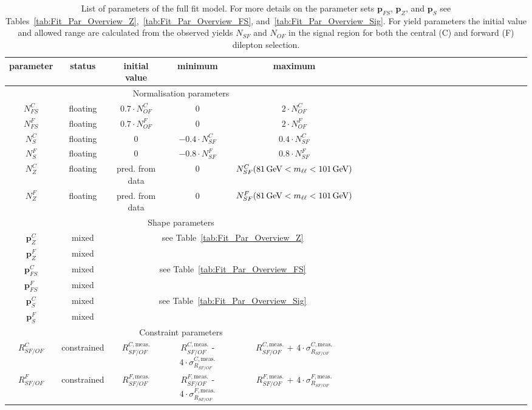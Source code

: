 \begin{table}[htbp]
\begin{center}
 \renewcommand{\arraystretch}{1.3}
 \caption{List of parameters of the full fit model. For more details on the parameter sets $\mathbf{p}_{FS}$, $\mathbf{p}_{Z}$, and $\mathbf{p}_{S}$ see Tables~\ref{tab:Fit_Par_Overview_Z},~\ref{tab:Fit_Par_Overview_FS}, and~\ref{tab:Fit_Par_Overview_Sig}. For yield parameters the initial value and allowed range are calculated from the observed yields $N_{SF}$ and $N_{OF}$ in the signal region for both the central (C) and forward (F) dilepton selection.\label{tab:Fit_Par_Overview_Full}}
\begin{tabular}{c|c|c|c|ccccccccccccccccccccc}
parameter & status & initial value & minimum & maximum \\ \hline
\multicolumn{5}{c}{Normalisation parameters}\\ \hline
$N_{FS}^{C}$ & floating & $0.7\cdot N_{OF}^{C}$ & 0 & $2\cdot N_{OF}^{C}$ \\
$N_{FS}^{F}$ & floating & $0.7\cdot N_{OF}^{F}$ & 0 & $2\cdot N_{OF}^{F}$ \\
$N_{S}^{C}$ & floating & 0 &  $-0.4\cdot N_{SF}^{C}$ &  $0.4\cdot N_{SF}^{C}$ \\
$N_{S}^{F}$ & floating & 0 &  $-0.8\cdot N_{SF}^{F}$ &  $0.8\cdot N_{SF}^{F}$ \\
$N_{Z}^{C}$ & floating & pred. from data & 0 & $N_{SF}^{C}(81\,\mathrm{Ge\hspace{-.08em}V} < m_{\ell\ell} < 101\,\mathrm{Ge\hspace{-.08em}V})$ \\
$N_{Z}^{F}$ & floating & pred. from data & 0 & $N_{SF}^{F}(81\,\mathrm{Ge\hspace{-.08em}V} < m_{\ell\ell} < 101\,\mathrm{Ge\hspace{-.08em}V})$ \\ \hline
\multicolumn{5}{c}{Shape parameters} \\ \hline
$\mathbf{p}_{Z}^{C}$ & mixed & \multicolumn{3}{c}{\multirow{2}{*}{see Table~\ref{tab:Fit_Par_Overview_Z}}}\\
$\mathbf{p}_{Z}^{F}$ & mixed & \multicolumn{3}{c}{}\\
$\mathbf{p}_{FS}^{C}$ & mixed & \multicolumn{3}{c}{\multirow{2}{*}{see Table~\ref{tab:Fit_Par_Overview_FS}}}\\
$\mathbf{p}_{FS}^{F}$ & mixed & \multicolumn{3}{c}{}\\
$\mathbf{p}_{S}^{C}$ & mixed & \multicolumn{3}{c}{\multirow{2}{*}{see Table~\ref{tab:Fit_Par_Overview_Sig}}}\\
$\mathbf{p}_{S}^{F}$ & mixed & \multicolumn{3}{c}{}\\ \hline
\multicolumn{5}{c}{Constraint parameters}\\ \hline
$R_{SF/OF}^{C}$ & constrained & $R_{SF/OF}^{C,\text{meas.}}$  & $R_{SF/OF}^{C,\text{meas.}}$ - $4\cdot \sigma_{R_{SF/OF}}^{C,\text{meas.}}$ & $R_{SF/OF}^{C,\text{meas.}}$ + $4\cdot \sigma_{R_{SF/OF}}^{C,\text{meas.}}$ \\
$R_{SF/OF}^{F}$ & constrained & $R_{SF/OF}^{F,\text{meas.}}$  & $R_{SF/OF}^{F,\text{meas.}}$ - $4\cdot \sigma_{R_{SF/OF}}^{F,\text{meas.}}$ & $R_{SF/OF}^{F,\text{meas.}}$ + $4\cdot \sigma_{R_{SF/OF}}^{F,\text{meas.}}$ \\
\end{tabular}

\end{center}
\end{table}


